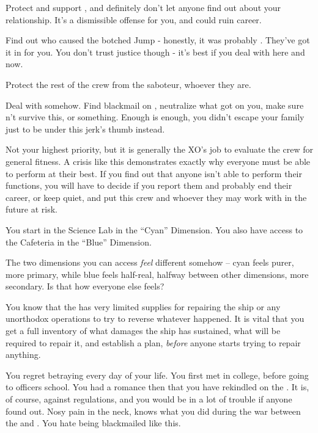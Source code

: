 \documentclass[char]{TMFHope}
\begin{document}
\begin{itemz}[Goals]
	\item Protect and support \cSci{}, and definitely don't let anyone find out about your relationship. It's a dismissible offense for you, and could ruin \cSci{\their} career.
	\item Find out who caused the botched Jump - honestly, it was probably \cDip{}. They've got it in for you. You don't trust \pPlan{} justice though - it's best if you deal with \cDip{\them} here and now.
	\item Protect the rest of the crew from the saboteur, whoever they are.
	\item Deal with \cDip{} somehow. Find blackmail on \cDip{\them}, neutralize what \cDip{\they} \cDip{\have} got on you, make sure \cDip{\they} \cDip{\does}n't survive this, or something. Enough is enough, you didn't escape your family just to be under this jerk's thumb instead.
	\item Not your highest priority, but it is generally the XO's job to evaluate the crew for general fitness. A crisis like this demonstrates exactly why everyone must be able to perform at their best. If you find out that anyone isn't able to perform their functions, you will have to decide if you report them and probably end their career, or keep quiet, and put this crew and whoever they may work with in the future at risk.
\end{itemz}

\begin{itemz}[Notes]
	\item You start in the Science Lab in the ``Cyan'' Dimension. You also have access to the Cafeteria in the ``Blue'' Dimension. 
	\item The two dimensions you can access {\em feel} different somehow -- cyan feels purer, more primary, while blue feels half-real, halfway between other dimensions, more secondary.  Is that how everyone else feels?
	\item You know that the \pNew{} has very limited supplies for repairing the ship or any unorthodox operations to try to reverse whatever happened. It is vital that you get a full inventory of what damages the ship has sustained, what will be required to repair it, and establish a plan, \emph{before} anyone starts trying to repair anything.
\end{itemz}

\begin{contacts}
	\contact{\cCap{}} You regret betraying \cCap{} every day of your life.
	\contact{\cSci{}} You first met \cSci{} in college, before going to officers school. You had a romance then that you have rekindled on the \pNew{}. It is, of course, against regulations, and you would be in a lot of trouble if anyone found out.
	\contact{\cDip{}} Nosy pain in the neck, \cDip{} knows what you did during the war between the \pPlan{} and \pEdge{}. You hate being blackmailed like this.
\end{contacts}
\end{document}
